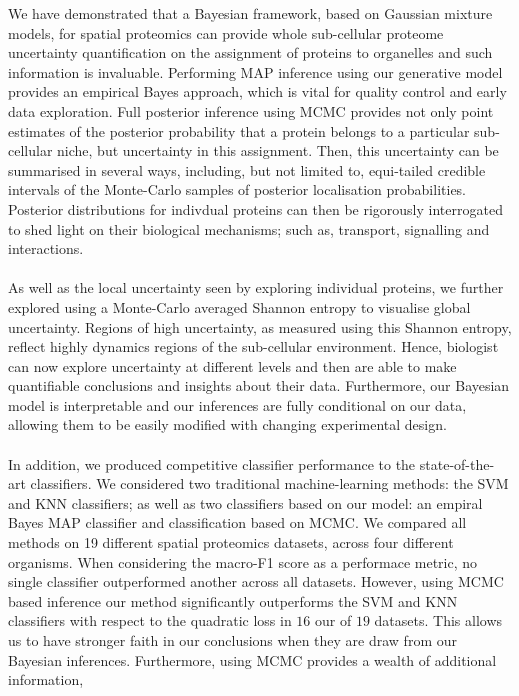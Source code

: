 \documentclass[12pt,english]{article}
\begin{document}
We have demonstrated that a Bayesian framework, based on Gaussian mixture models, for spatial proteomics
can provide whole sub-cellular proteome uncertainty quantification
on the assignment of proteins to organelles and such information is
invaluable. Performing MAP inference using our generative model provides
an empirical Bayes approach, which is vital for quality control and early data
exploration. Full posterior inference using
MCMC provides not only point estimates of the posterior probability that a
protein belongs to a particular sub-cellular niche, but uncertainty in this
assignment. Then, this uncertainty can be summarised in several ways, including,
but not limited to, equi-tailed credible intervals of the Monte-Carlo samples of posterior localisation probabilities.
Posterior distributions for indivdual proteins can then be rigorously interrogated
to shed light on their biological mechanisms; such as, transport, signalling and interactions.
\\
\\
As well as the local uncertainty seen by exploring individual proteins, we further explored
using a Monte-Carlo averaged Shannon entropy to visualise global uncertainty. Regions of high uncertainty,
as measured using this Shannon entropy, reflect highly dynamics regions of the sub-cellular environment.
Hence, biologist can now explore uncertainty at different levels and then are able to
make quantifiable conclusions and insights about their data.
Furthermore, our Bayesian model is interpretable and our inferences are fully conditional
on our data, allowing them to be easily modified with changing experimental design.
\\
\\
In addition, we produced competitive classifier performance to the state-of-the-art
classifiers. We considered two traditional machine-learning methods: the SVM and KNN classifiers;
as well as two classifiers based on our model: an empiral Bayes MAP classifier and classification
based on MCMC. We compared all methods on 19 different spatial proteomics datasets, across
four different organisms. When considering the macro-F1 score as a performace metric, no single classifier outperformed another across all datasets. However, using MCMC based inference our method significantly outperforms the SVM and KNN classifiers with respect to the quadratic loss in $16$ our of $19$
datasets. This allows us to have stronger faith in our conclusions when they are draw from our Bayesian inferences. Furthermore, using MCMC provides a wealth of additional information,
\end{document}
